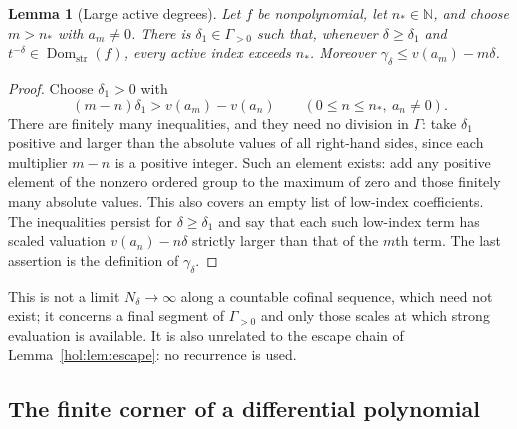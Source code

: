 \documentclass[11pt]{article}
\numberwithin{equation}{section}
\newtheorem{lemma}[theorem]{Lemma}
\theoremstyle{definition}
\theoremstyle{remark}
\newcommand{\N}{\mathbb N}
\newcommand{\Dom}{\operatorname{Dom}_{\mathrm{str}}}
\begin{document}
\begin{lemma}[Large active degrees]\label{hol:nl:lem:active}
Let $f$ be nonpolynomial, let $n_\ast\in\N$, and choose $m>n_\ast$ with
$a_m\ne0$. There is $\delta_1\in\Gamma_{>0}$ such that, whenever
$\delta\ge\delta_1$ and $t^{-\delta}\in\Dom(f)$, every active index exceeds
$n_\ast$. Moreover $\gamma_\delta\le v(a_m)-m\delta$.
\end{lemma}

\begin{proof}
Choose $\delta_1>0$ with
\begin{equation}\label{hol:nl:eq:lowindices}
 (m-n)\delta_1>v(a_m)-v(a_n)\qquad(0\le n\le n_\ast,\ a_n\ne0).
\end{equation}
There are finitely many inequalities, and they need no division in $\Gamma$:
take $\delta_1$ positive and larger than the absolute values of all right-hand
sides, since each multiplier $m-n$ is a positive integer. Such an element
exists: add any positive element of the nonzero ordered group to the maximum
of zero and those finitely many absolute values. This also covers an empty
list of low-index coefficients. The inequalities persist for
$\delta\ge\delta_1$ and say that each such low-index term has scaled valuation
$v(a_n)-n\delta$ strictly larger than that of the $m$th term. The last
assertion is the definition of $\gamma_\delta$.
\end{proof}

This is not a limit $N_\delta\to\infty$ along a countable cofinal sequence,
which need not exist; it concerns a final segment of $\Gamma_{>0}$ and only
those scales at which strong evaluation is available. It is also unrelated to
the escape chain of Lemma~\ref{hol:lem:escape}: no recurrence is used.

\subsection{The finite corner of a differential polynomial}
\label{hol:nl:sub:corner}
\end{document}
